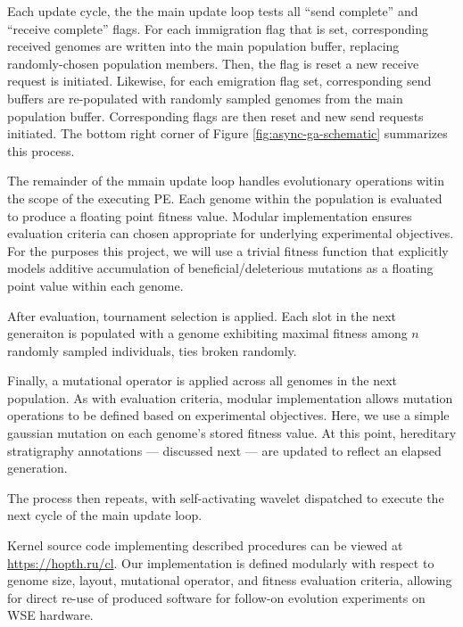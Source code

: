 Each update cycle, the the main update loop tests all ``send complete'' and ``receive complete'' flags.
For each immigration flag that is set, corresponding received genomes are written into the main population buffer, replacing randomly-chosen population members.
Then, the flag is reset a new receive request is initiated.
Likewise, for each emigration flag set, corresponding send buffers are re-populated with randomly sampled genomes from the main population buffer.
Corresponding flags are then reset and new send requests initiated.
The bottom right corner of Figure \ref{fig:async-ga-schematic} summarizes this process.

The remainder of the mmain update loop handles evolutionary operations witin the scope of the executing PE.
Each genome within the population is evaluated to produce a floating point fitness value.
Modular implementation ensures evaluation criteria can chosen appropriate for underlying experimental objectives.
For the purposes this project, we will use a trivial fitness function that explicitly models additive accumulation of beneficial/deleterious mutations as a floating point value within each genome.

After evaluation, tournament selection is applied.
Each slot in the next generaiton is populated with a genome exhibiting maximal fitness among $n$ randomly sampled individuals, ties broken randomly.

Finally, a mutational operator is applied across all genomes in the next population.
As with evaluation criteria, modular implementation allows mutation operations to be defined based on experimental objectives.
Here, we use a simple gaussian mutation on each genome's stored fitness value.
At this point, hereditary stratigraphy annotations --- discussed next --- are updated to reflect an elapsed generation.

The process then repeats, with self-activating wavelet dispatched to execute the next cycle of the main update loop.

Kernel source code implementing described procedures can be viewed at \url{https://hopth.ru/cl}.
Our implementation is defined modularly with respect to genome size, layout, mutational operator, and fitness evaluation criteria, allowing for direct re-use of produced software for follow-on evolution experiments on WSE hardware.


